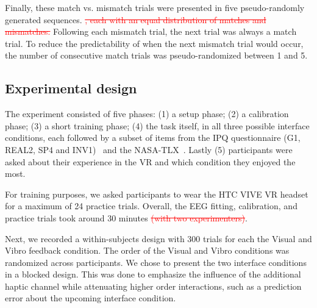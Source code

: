 Finally, these match vs. mismatch trials were presented in five \textcolor{n}{pseudo-}randomly generated sequences. \textcolor{red}{\st{, each with an equal distribution of matches and mismatches.}} \textcolor{n}{Following each mismatch trial, the next trial was always a match trial. To reduce the predictability of when the next mismatch trial would occur, the number of consecutive match trials was pseudo-randomized between 1 and 5.}

\subsection{Experimental design}
The experiment consisted of five phases: (1) a setup phase; (2) a calibration phase; (3) a short training phase; (4) the task itself, in all three possible interface conditions, each followed by a subset of items from the IPQ questionnaire (G1, REAL2, SP4 and INV1)~\cite{Schubert2003-sq} and the NASA-TLX~\cite{Hart1988-iw}. Lastly (5) participants were asked about their experience in the VR and which condition they enjoyed the most.

For training purposes, we asked participants to wear the HTC VIVE VR headset for a maximum of 24 practice trials. Overall, the EEG fitting, calibration, and practice trials took around 30 minutes \textcolor{red}{\st{(with two experimenters)}}. 

Next, we recorded a within-subjects design with 300 trials for each the Visual and Vibro feedback condition. The order of the Visual and Vibro conditions was randomized across participants. \textcolor{n}{We chose to present the two interface conditions in a blocked design. This was done to emphasize the influence of the additional haptic channel while attenuating higher order interactions, such as a prediction error about the upcoming interface condition.}





